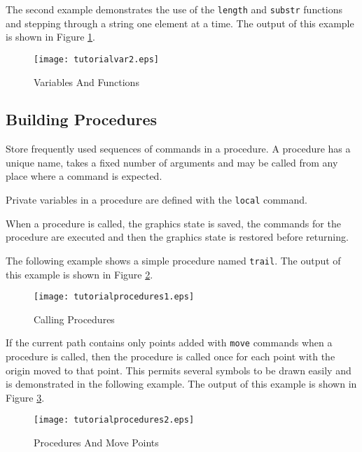 The second example demonstrates the use of the
\texttt{length} and \texttt{substr}
functions
and stepping through a string one element at a time.
The output of this example is shown in Figure \ref{tutorialvar2}.



\begin{figure}[htb]
\texttt{[image: tutorialvar2.eps]}
\caption{Variables And Functions}
\label{tutorialvar2}
\end{figure}


\subsection{Building Procedures}

Store frequently used sequences of commands in a procedure.
A procedure has a unique name, takes a fixed number of arguments and
may be called from any place where a command is expected.

Private variables in a procedure are defined with the 
\texttt{local} command.

When a procedure is called, the graphics state
is saved, the commands for the procedure are executed and then the
graphics state is restored before returning.

The following example shows a simple procedure named \texttt{trail}.
The output of this example is shown in Figure \ref{tutorialprocedures1}.



\begin{figure}[htb]
\texttt{[image: tutorialprocedures1.eps]}
\caption{Calling Procedures}
\label{tutorialprocedures1}
\end{figure}

If the current path contains only points added with \texttt{move}
commands when a procedure is called, then the
procedure is called once for each point with the origin
moved to that point.  This permits several symbols to be drawn
easily and is demonstrated in the following example.  The 
output of this example is shown in Figure \ref{tutorialprocedures2}.



\begin{figure}[htb]
\texttt{[image: tutorialprocedures2.eps]}
\caption{Procedures And Move Points}
\label{tutorialprocedures2}
\end{figure}



